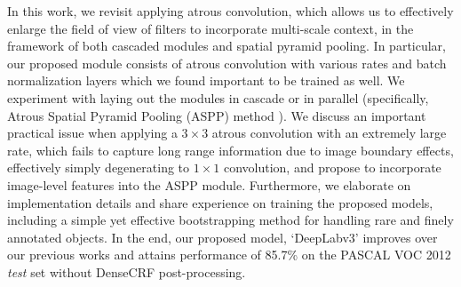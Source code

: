 In this work, we revisit applying atrous convolution, which allows us to effectively enlarge the field of view of filters to incorporate multi-scale context, in the framework of both cascaded modules and spatial pyramid pooling. In particular, our proposed module consists of atrous convolution with various rates and batch normalization layers which we found important to be trained as well. We experiment with laying out the modules in cascade or in parallel (specifically, Atrous Spatial Pyramid Pooling (ASPP) method \cite{chen2016deeplab}). We discuss an important practical issue when applying a $3\times3$ atrous convolution with an extremely large rate, which fails to capture long range information due to image boundary effects, effectively simply degenerating to $1\times1$ convolution, and propose to incorporate image-level features into the ASPP module. Furthermore, we elaborate on implementation details and share experience on training the proposed models, including a simple yet effective bootstrapping method for handling rare and finely annotated objects. In the end, our proposed model, `DeepLabv3' improves over our previous works \cite{chen2014semantic, chen2016deeplab} and attains performance of 85.7\% on the PASCAL VOC 2012 \textit{test} set without DenseCRF post-processing. 

